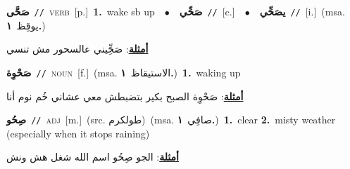\documentclass[10pt,a4paper,twoside]{article} %
\begin{document}
\begin{multicols}{2}
{\setlength\topsep{0pt}\textbf{\foreignlanguage{arabic}{صَحَّى}}\ {\color{gray}\texttt{//}\color{black}}\ \textsc{verb}\ [p.]\ \textbf{1.}~wake sb up\ \ $\bullet$\ \ \setlength\topsep{0pt}\textbf{\foreignlanguage{arabic}{صَحِّي}}\ {\color{gray}\texttt{//}\color{black}}\ [c.]\ \ $\bullet$\ \ \setlength\topsep{0pt}\textbf{\foreignlanguage{arabic}{يصَحِّي}}\ {\color{gray}\texttt{//}\color{black}}\ [i.]\ \color{gray}(msa. \foreignlanguage{arabic}{يوقِظ}~\foreignlanguage{arabic}{\textbf{١.}})\color{black}\  \begin{flushright}\color{gray}\foreignlanguage{arabic}{\textbf{\underline{\foreignlanguage{arabic}{أمثلة}}}: صَحِِّيني عالسحور مش تنسي}\end{flushright}\color{black}} \vspace{2mm}

{\setlength\topsep{0pt}\textbf{\foreignlanguage{arabic}{صَحْوِة}}\ {\color{gray}\texttt{//}\color{black}}\ \textsc{noun}\ [f.]\ \color{gray}(msa. \foreignlanguage{arabic}{الاستيقاظ}~\foreignlanguage{arabic}{\textbf{١.}})\color{black}\ \textbf{1.}~waking up\  \begin{flushright}\color{gray}\foreignlanguage{arabic}{\textbf{\underline{\foreignlanguage{arabic}{أمثلة}}}: صَحْوِة الصبح بكير بتضبطش معي عشاني خُم نوم أنا}\end{flushright}\color{black}} \vspace{2mm}

{\setlength\topsep{0pt}\textbf{\foreignlanguage{arabic}{صِحُو}}\ {\color{gray}\texttt{//}\color{black}}\ \textsc{adj}\ [m.]\ (src. \color{gray}\foreignlanguage{arabic}{طولكرم}\color{black})\ \color{gray}(msa. \foreignlanguage{arabic}{صافِي}~\foreignlanguage{arabic}{\textbf{١.}})\color{black}\ \textbf{1.}~clear  \textbf{2.}~misty weather (especially when it stops raining)\  \begin{flushright}\color{gray}\foreignlanguage{arabic}{\textbf{\underline{\foreignlanguage{arabic}{أمثلة}}}: الجو صِحُو اسم الله شغل هش ونش}\end{flushright}\color{black}} \vspace{2mm}


\end{multicols}
\end{document}
